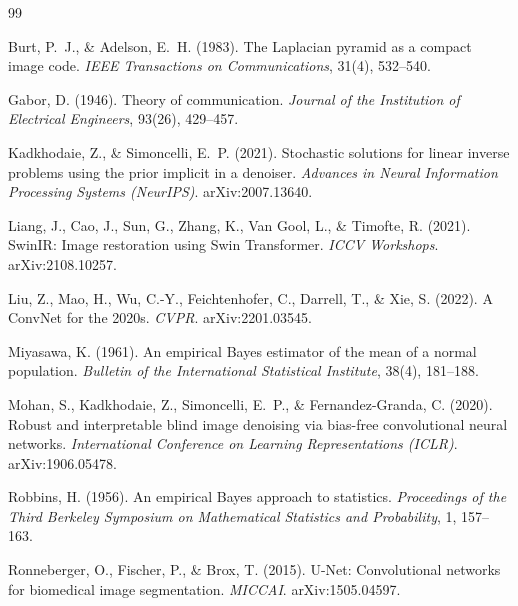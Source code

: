 \documentclass{article}
\begin{document}

\begin{thebibliography}{99}

Burt, P.~J., \& Adelson, E.~H. (1983).
\newblock The Laplacian pyramid as a compact image code.
\newblock \emph{IEEE Transactions on Communications}, 31(4), 532--540.

Gabor, D. (1946).
\newblock Theory of communication.
\newblock \emph{Journal of the Institution of Electrical Engineers}, 93(26), 429--457.

Kadkhodaie, Z., \& Simoncelli, E.~P. (2021).
\newblock Stochastic solutions for linear inverse problems using the prior implicit in a denoiser.
\newblock \emph{Advances in Neural Information Processing Systems (NeurIPS)}. arXiv:2007.13640.

Liang, J., Cao, J., Sun, G., Zhang, K., Van Gool, L., \& Timofte, R. (2021).
\newblock SwinIR: Image restoration using Swin Transformer.
\newblock \emph{ICCV Workshops}. arXiv:2108.10257.

Liu, Z., Mao, H., Wu, C.-Y., Feichtenhofer, C., Darrell, T., \& Xie, S. (2022).
\newblock A ConvNet for the 2020s.
\newblock \emph{CVPR}. arXiv:2201.03545.

Miyasawa, K. (1961).
\newblock An empirical Bayes estimator of the mean of a normal population.
\newblock \emph{Bulletin of the International Statistical Institute}, 38(4), 181--188.

Mohan, S., Kadkhodaie, Z., Simoncelli, E.~P., \& Fernandez-Granda, C. (2020).
\newblock Robust and interpretable blind image denoising via bias-free convolutional neural networks.
\newblock \emph{International Conference on Learning Representations (ICLR)}. arXiv:1906.05478.

Robbins, H. (1956).
\newblock An empirical Bayes approach to statistics.
\newblock \emph{Proceedings of the Third Berkeley Symposium on Mathematical Statistics and Probability}, 1, 157--163.

Ronneberger, O., Fischer, P., \& Brox, T. (2015).
\newblock U-Net: Convolutional networks for biomedical image segmentation.
\newblock \emph{MICCAI}. arXiv:1505.04597.


\end{thebibliography}
\end{document}
